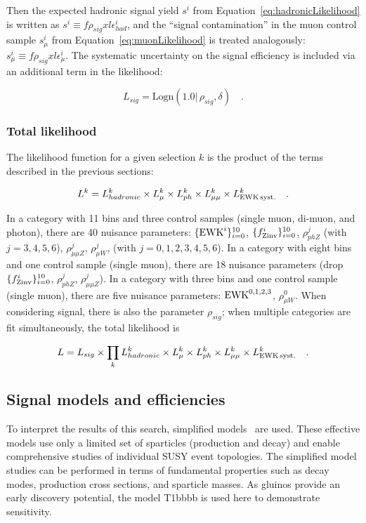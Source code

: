 Then the expected hadronic signal yield $s^i$ from
Equation~\ref{eq:hadronicLikelihood} is written as $s^i \equiv
f\rho_{sig} xl\epsilon_{had}^i$, and the ``signal contamination'' in
the muon control sample $s_{\mu}^i$ from
Equation~\ref{eq:muonLikelihood} is treated analogously: $s_{\mu}^i
\equiv f\rho_{sig} xl\epsilon_{\mu}^i$.  The systematic uncertainty on
the signal efficiency is included via an additional term in the
likelihood:

\begin{equation}
L_{sig}=\mathrm{Logn}(1.0 |\,\rho_{sig}, \delta) \quad .
\end{equation}

\subsubsection{Total likelihood}
\label{sec:totalLikelihood}

The likelihood function for a given selection $k$ is the product of
the terms described in the previous sections:

\begin{equation}
L^k = L_{hadronic}^k \times L_{\mu}^k \times L_{ph}^k \times
L_{\mu\mu}^k\times L_{\rm EWK\, syst.}^k \quad .
\end{equation}

In a category with 11 \HT bins and three control samples (single muon,
di-muon, and photon), there are 40 nuisance parameters:
$\{\mathrm{EWK}^{i}\}_{i=0}^{10}$, $\{f_{\rm Zinv}^{i}\}_{i=0}^{10}$, $\rho_{phZ}^j$
(with $j=3,4,5,6$), $\rho_{\mu\mu Z}^j$, $\rho_{\mu W}^j$, (with
$j=0,1,2,3,4,5,6$).  In a category with eight \HT bins and one control
sample (single muon), there are 18 nuisance parameters (drop
$\{f_{\rm Zinv}^{i}\}_{i=0}^{10}$, $\rho_{phZ}^j$, $\rho_{\mu\mu Z}^j$).  In
a category with three \HT bins and one control sample (single muon),
there are five nuisance parameters: $\mathrm{EWK}^{0,1,2,3}$, $\rho_{\mu
  W}^0$.  When considering signal, there is also the parameter
$\rho_{sig}$; when multiple categories are fit simultaneously, the
total likelihood is


\begin{equation}
L = L_{sig}\times \prod_k L_{hadronic}^k
\times L_{\mu}^k \times L_{ph}^k \times L_{\mu\mu}^k \times L_{\rm EWK\, syst.}^k \quad .
\end{equation}

\subsection{Signal models and efficiencies\label{sec:signal}}
To interpret the results of this search, simplified
models~\cite{Alwall:2008ag,Alwall:2008va,sms} are used. These
effective models use only a limited set of sparticles (production and
decay) and enable comprehensive studies of individual SUSY event
topologies. The simplified model studies can be performed in terms of
fundamental properties such as decay modes, production cross sections,
and sparticle masses. As gluinos provide an early discovery potential, the model
T1bbbb is used here to demonstrate sensitivity.

